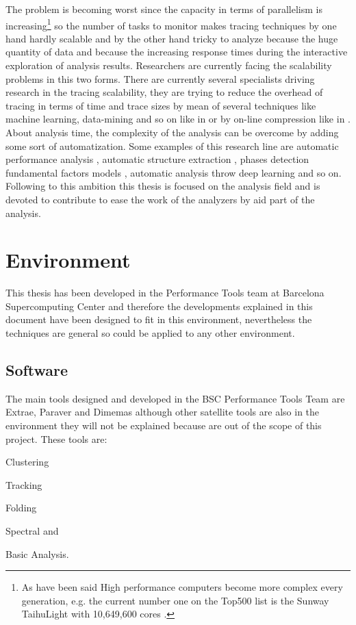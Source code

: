 The problem is becoming worst since the capacity in 
terms of parallelism is increasing\footnote{As have been said High performance 
computers become more complex every generation, e.g. the current number one on 
the Top500 list is the Sunway TaihuLight with 10,649,600 cores\cite{top500_2017} 
.} so the number of tasks to monitor makes 
tracing techniques by one hand hardly scalable and by the other hand tricky to analyze
because the huge quantity of data and because the increasing response times
during the interactive exploration of analysis results. Researchers are currently 
facing the scalability problems in this two forms. 
There are currently several specialists driving research in the tracing
scalability, they are trying to reduce 
the overhead of tracing in terms of time and trace sizes by mean of several 
techniques like machine learning, data-mining and so on like in 
\cite{llort2015intelligent} or by on-line compression like in
\cite{noeth2009scalatrace}. About analysis time, the complexity of the analysis 
can be overcome by adding some sort of automatization. Some examples of this 
research line are automatic performance analysis \cite{wolf2003automatic}, 
automatic structure extraction \cite{casas2007automatic}, phases detection 
\cite{gonzalez2013application} fundamental factors models \cite{casas2008aass}, 
automatic analysis throw deep learning \cite{simon:2017:perfdp} and so on.
Following to this ambition this thesis is focused on the analysis field and is 
devoted to contribute to ease the work of the analyzers by aid part of the analysis. 

\section{Environment}\label{s:pt_evironment}

This thesis has been developed in the Performance Tools team at Barcelona
Supercomputing Center and therefore the developments explained in this
document have been designed to fit in this environment, nevertheless the
techniques are general so could be applied to any other environment.

\subsection{Software}

The main tools designed and developed in the BSC Performance Tools Team are 
Extrae, Paraver and Dimemas although other satellite tools are also in the 
environment they will not be explained because are out of the scope of this 
project. These tools are: 
\begin{enumerate*}[label=\roman*)]
  \item Clustering
  \item Tracking
  \item Folding
  \item Spectral and 
  \item Basic Analysis.
\end{enumerate*}

